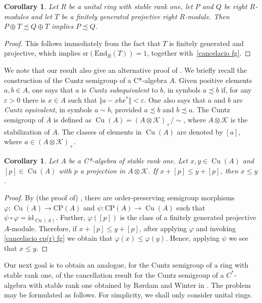 \documentclass[11pt]{amsart}
\numberwithin{equation}{section}
\newtheorem{cor}[corCt]{Corollary}
\theoremstyle{definition}
\DeclareMathOperator{\Cu}{Cu}
\newcommand{\CP}{\mathrm{CP}}
\theoremstyle{plain}
\theoremstyle{definition}
\begin{document}
\begin{cor} \label{cancelacio cp(r) fg}
Let $R$ be a unital ring with stable rank one, let $P$ and $Q$ be right $R$-modules and let $T$ be a finitely generated projective right $R$-module. Then $P \oplus T \precsim Q \oplus T$ implies $P \precsim Q$.  
\end{cor}

\begin{proof}
This follows immediately from the fact that $T$ is finitely generated and projective, which implies $\mathrm{sr}(\mathrm{End}_R(T)) = 1$, together with~\autoref{cancelacio fg}.
\end{proof}

We note that our result also give an alternative proof of \cite[Proposition 4.2]{RorWin10ZRevisited}. We briefly recall the construction of the Cuntz semigroup of a C*-algebra $A$. Given positive elements $a,b\in A$, one says that $a$ is \emph{Cuntz subequivalent} to $b$, in symbols $a\precsim b$ if, for any $\varepsilon>0$ there is $x\in A$ such that $\Vert a-xbx^*\Vert<\varepsilon$. One also says that $a$ and $b$ are \emph{Cuntz equivalent}, in symbols $a\sim b$, provided $a\precsim b$ and $b\precsim a$. The Cuntz semigroup of $A$ is defined as $\Cu(A)=(A\otimes\mathcal{K})_+/{\sim}$, where $A\otimes \mathcal{K}$ is the stabilization of $A$. The classes of elements in $\Cu(A)$ are denoted by $[a]$, where $a\in (A\otimes\mathcal{K})_+$.
\begin{cor}
Let $A$ be a C*-algebra of stable rank one. Let $x,y\in \Cu(A)$ and $[p]\in \Cu(A)$ with $p$ a projection in $A\otimes \mathcal{K}$. If $x+[p]\leq y+[p]$, then $x\leq y$.
\end{cor}
\begin{proof}
By (the proof of) \cite[Theorem 7.6]{AntAraBosPerVil25}, there are order-preserving semigroup morphisms $\varphi\colon \Cu(A)\to \CP(A)$ and $\psi\colon \CP(A)\to \Cu(A)$ such that $\psi\circ\varphi=\mathrm{id}_{\Cu(A)}$. Further, $\varphi([p])$ is the class of a finitely generated projective $A$-module. Therefore, if $x+[p]\leq y+[p]$, after applying $\varphi$ and invoking \autoref{cancelacio cp(r) fg} we obtain that $\varphi(x)\leq \varphi(y)$. Hence, applying $\psi$ we see that $x\leq y$.
\end{proof}


Our next goal is to obtain an analogue, for the Cuntz semigroup of a ring with stable rank one, of the cancellation result for the Cuntz semigroup of a $C^*$-algebra with stable rank one obtained by R\o rdam and Winter in \cite[Theorem 4.2]{RorWin10ZRevisited}. The problem may be formulated as follows. For simplicity, we shall only consider unital rings.
\end{document}
